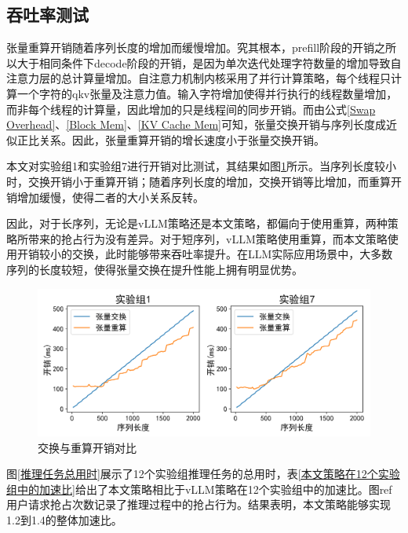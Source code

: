 \documentclass[a4paper, nosysfonts]{hpcchina}
\begin{document}
\subsection{吞吐率测试}
张量重算开销随着序列长度的增加而缓慢增加。究其根本，prefill阶段的开销之所以大于相同条件下decode阶段的开销，是因为单次迭代处理字符数量的增加导致自注意力层的总计算量增加。自注意力机制内核采用了并行计算策略，每个线程只计算一个字符的qkv张量及注意力值。输入字符增加使得并行执行的线程数量增加，而非每个线程的计算量，因此增加的只是线程间的同步开销。而由公式\ref{Swap Overhead}、\ref{Block Mem}、\ref{KV Cache Mem}可知，张量交换开销与序列长度成近似正比关系。因此，张量重算开销的增长速度小于张量交换开销。 \par
本文对实验组1和实验组7进行开销对比测试，其结果如图\ref{交换与重算开销对比}所示。当序列长度较小时，交换开销小于重算开销；随着序列长度的增加，交换开销等比增加，而重算开销增加缓慢，使得二者的大小关系反转。 \par
因此，对于长序列，无论是vLLM策略还是本文策略，都偏向于使用重算，两种策略所带来的抢占行为没有差异。对于短序列，vLLM策略使用重算，而本文策略使用开销较小的交换，此时能够带来吞吐率提升。在LLM实际应用场景中，大多数序列的长度较短，使得张量交换在提升性能上拥有明显优势。 \par
\begin{figure}[!htbp]
  \centering
  \includegraphics[width=0.9\linewidth]
  {交换与重算开销对比.png}
  \caption{交换与重算开销对比}
  \label{交换与重算开销对比}
\end{figure}
图\ref{推理任务总用时}展示了12个实验组推理任务的总用时，表\ref{本文策略在12个实验组中的加速比}给出了本文策略相比于vLLM策略在12个实验组中的加速比。图ref{用户请求抢占次数}记录了推理过程中的抢占行为。结果表明，本文策略能够实现1.2到1.4的整体加速比。
\end{document}
